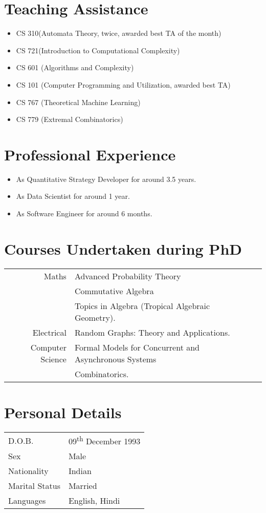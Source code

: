 \documentclass[a4paper,10pt]{article}
\begin{document}
\section{Teaching Assistance}

\begin{itemize}
  \item CS 310(Automata Theory, twice, awarded best TA of the month)
  \item CS 721(Introduction to Computational Complexity)
  \item CS 601 (Algorithms and Complexity)
  \item CS 101 (Computer Programming and Utilization, awarded best TA)
  \item CS 767 (Theoretical Machine Learning)
  \item CS 779 (Extremal Combinatorics)
\end{itemize}

\section{Professional Experience}

\begin{itemize}
  \item As Quantitative Strategy Developer for around 3.5 years.
  \item As Data Scientist for around 1 year.
  \item As Software Engineer for around 6 months.
\end{itemize}

\section{Courses Undertaken during PhD}

\begin{tabular}{rp{11cm}l}
  Maths & Advanced Probability Theory\\ & Commutative Algebra\\ & Topics in Algebra (Tropical Algebraic Geometry). \\
  Electrical & Random Graphs: Theory and Applications. \\
  Computer Science & Formal Models for Concurrent and Asynchronous Systems\\ & Combinatorics.
\end{tabular}

\section{Personal Details}

\begin{tabular}{ll}
  D.O.B. & 09\textsuperscript{th} December 1993 \\
  Sex & Male \\
  Nationality & Indian \\
  Marital Status & Married \\
  Languages & English, Hindi
\end{tabular}
\end{document}
